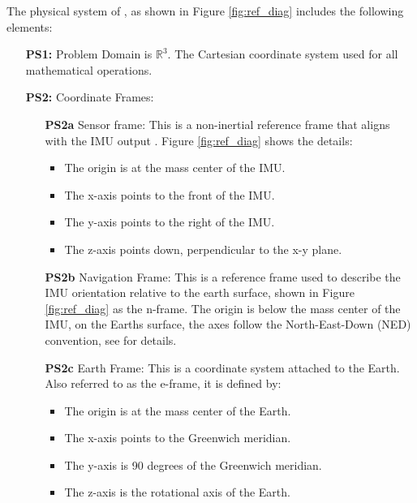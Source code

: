 \documentclass[12pt]{article}
\begin{document}
The physical system of \progname{}, as shown in Figure \ref{fig:ref_diag} includes the following
elements:

\begin{itemize}
  \item[\textbf{PS1:}] Problem Domain is $\mathbb{R}^3$. The Cartesian coordinate system used for
  all mathematical operations.

  \item[\textbf{PS2:}] Coordinate Frames:
  \begin{itemize}
      \item[\textbf{PS2a}] Sensor frame: This is a non-inertial reference frame that aligns with the
      IMU output \cite{al-jlailaty_efficient_2020}. Figure \ref{fig:ref_diag} shows the details:
        \begin{itemize}
            \item The origin is at the mass center of the IMU.
            \item The x-axis points to the front of the IMU.
            \item The y-axis points to the right of the IMU.
            \item The z-axis points down, perpendicular to the x-y plane.
        \end{itemize}
    \item[\textbf{PS2b}] Navigation Frame: This is a reference frame used to describe the IMU
    orientation relative to the earth surface, shown in Figure \ref{fig:ref_diag} as the n-frame.
    The origin is below the mass center of the IMU, on the Earths surface, the axes follow the
    North-East-Down (NED) convention, see \cite{ned} for details.

    \item[\textbf{PS2c}] Earth Frame: This is a coordinate system attached to the Earth. Also
    referred to as the e-frame, it is defined by:
    \begin{itemize}
        \item The origin is at the mass center of the Earth.
        \item The x-axis points to the Greenwich meridian.
        \item The y-axis is 90 degrees of the Greenwich meridian.
        \item The z-axis is the rotational axis of the Earth.
        \end{itemize}
  \end{itemize}


\end{itemize}
\end{document}
